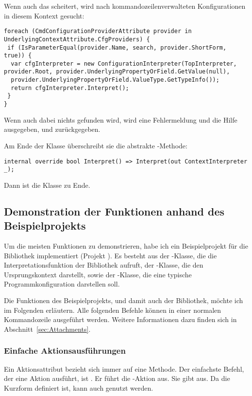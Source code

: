 Wenn auch das scheitert, wird nach kommandozeilenverwalteten Konfigurationen in diesem Kontext gesucht:
\begin{lstlisting}[title=""]
foreach (CmdConfigurationProviderAttribute provider in UnderlyingContextAttribute.CfgProviders) {
 if (IsParameterEqual(provider.Name, search, provider.ShortForm, true)) {
  var cfgInterpreter = new ConfigurationInterpreter(TopInterpreter, provider.Root, provider.UnderlyingPropertyOrField.GetValue(null),
  provider.UnderlyingPropertyOrField.ValueType.GetTypeInfo());
  return cfgInterpreter.Interpret();
 }
}
\end{lstlisting}
Wenn auch dabei nichts gefunden wird, wird eine Fehlermeldung und die Hilfe ausgegeben, und  zurückgegeben.

Am Ende der Klasse überschreibt sie die abstrakte -Methode:
\begin{lstlisting}[title=""]
 internal override bool Interpret() => Interpret(out ContextInterpreter _);
\end{lstlisting}
Dann ist die Klasse zu Ende.
\subsection{Demonstration der Funktionen anhand des Beispielprojekts}\label{subsec:demonstration}
Um die meisten Funktionen zu demonstrieren, habe ich ein Beispielprojekt für die Bibliothek implementiert (Projekt ).
Es besteht aus der -Klasse, die die Interpretationsfunktion der Bibliothek aufruft, der -Klasse, 
die den Ursprungskontext darstellt, sowie der -Klasse, die eine typische Programmkonfiguration darstellen soll.

Die Funktionen des Beispielprojekts, und damit auch der Bibliothek, möchte ich im Folgenden erläutern.
Alle folgenden Befehle können in einer normalen Kommandozeile ausgeführt werden.
Weitere Informationen dazu finden sich in Abschnitt~\ref{sec:Attachments}.%
\subsubsection{Einfache Aktionsausführungen}
Ein Aktionsattribut bezieht sich immer auf eine Methode.
Der einfachste Befehl, der eine Aktion ausführt, ist .
Er führt die -Aktion aus.
Sie gibt  aus.
Da die Kurzform  definiert ist, kann auch  genutzt werden.

